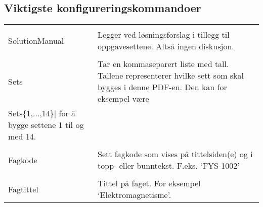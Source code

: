 \documentclass{article}
\begin{document}
\subsection*{Viktigste konfigureringskommandoer}
\begin{tabularx}{\textwidth}{lX}
	\lstinline{\\SolutionManual}&Legger ved løsningsforslag i tillegg til oppgavesettene. Altså ingen diskusjon.\\
	\lstinline{\\Sets}&Tar en kommaseparert liste med tall. Tallene representerer hvilke sett som skal bygges i denne PDF-en. Den kan for eksempel være \lstinline|\\Sets\{1,...,14\}| for å bygge settene 1 til og med 14.\\
	\lstinline{\\Fagkode}&Sett fagkode som vises på tittelsiden(e) og i topp- eller bunntekst. F.eks. `FYS-1002'\\
	\lstinline{\\Fagtittel}&Tittel på faget. For eksempel `Elektromagnetisme'.
\end{tabularx}
\end{document}
